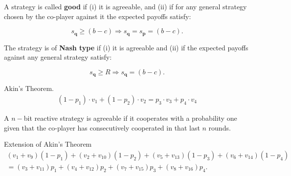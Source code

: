 \documentclass{beamer}
\begin{document}
\begin{frame}
    \footnotesize{
    \begin{definition}
        A strategy is called \textbf{good} if (i) it is agreeable,
        and (ii) if for any general strategy chosen by the co-player against it the expected
        payoffs satisfy:
        
        \begin{equation}
          s_{\mathbf{q}} \geq (b - c) \Rightarrow s_{\mathbf{q}} = s_{\mathbf{p}} =  (b - c).
        \end{equation}
      
        The strategy is of \textbf{Nash type} if (i) it is agreeable and (ii) if the
        expected payoffs against any general strategy satisfy:
      
        \begin{equation}
          s_{\mathbf{q}} \geq R \Rightarrow s_{\mathbf{q}} =  (b - c).
        \end{equation}
      \end{definition}}
\end{frame}

\begin{frame}
    \begin{theorem}{Akin's Theorem.}
        \begin{align*}
        (1 - p_1) \cdot v_1 + (1 - p_2) \cdot v_2 = p_3 \cdot v_3 + p_4 \cdot v_4
        \end{align*}
    \end{theorem}
\end{frame}


\begin{frame}
    \begin{center}
        
    \end{center}
\end{frame}

\begin{frame}
    \begin{definition}
        A \(n-\)bit reactive strategy is agreeable if it cooperates with a probability one
        given that the co-player has consecutively cooperated in that last \(n\) rounds.
    \end{definition}
\end{frame}

\begin{frame}
    \tiny{
    \begin{lemma}{Extension of Akin's Theorem}
        \begin{align*}
        (v_{1} + v_{9}) (1 - p_1) + (v_{2} + v_{10}) (1 - p_2)  + (v_{5} + v_{13}) (1 - p_3) + (v_{6} + v_{14}) (1 - p_4) \nonumber \\
        = (v_{3} + v_{11})p_1  + (v_{4} + v_{12})p_2 + (v_{7} + v_{15}) p_3 + (v_{8} + v_{16}) p_4.
        \end{align*}
      \end{lemma}}
\end{frame}
\end{document}
